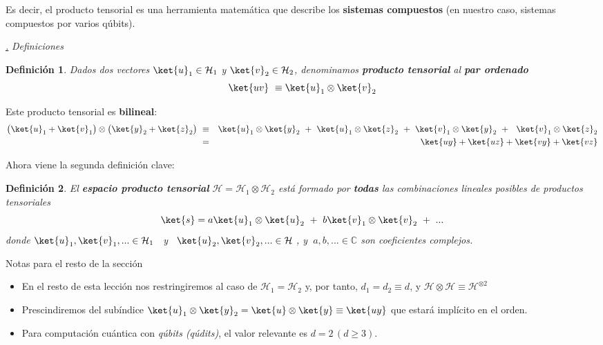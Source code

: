 \documentclass[a4paper,11pt]{book} %
\newtheorem{definicion_contador}{Definición}
\newcommand{\Definicion}[1]{
		\begin{mybox_gray2}{}
			\begin{definicion_contador}
				 #1 
			\end{definicion_contador} 
		\end{mybox_gray2}
	}
\numberwithin{equation}{chapter}
\def\subsubiContadorIt{\par\addtocounter{subsubsection}{1}\underline{\it\thesubsubsection.}\hskip0.5cm \setcounter{subsubsubsectionIt}{0}}
\newcommand{\SubsubiIt}[1]{
		\subsubiContadorIt \textit{#1}
	}
\newcounter{subsubsubsectionIt}[subsubsection]
\begin{document}
Es decir, el producto tensorial es una herramienta matemática que describe los \textbf{sistemas compuestos} (en nuestro caso, sistemas compuestos por varios qúbits).

			\SubsubiIt{Definiciones}

\Definicion{
Dados dos vectores $\ket{u}_1\in \mathcal{H}_1$ y  $\ket{v}_2\in \mathcal{H}_2$, denominamos \textbf{producto tensorial} al \textbf{par ordenado}
	\begin{equation}
	\ket{uv} ~\equiv \ket{u}_1\otimes \ket{v}_2
	\end{equation}
}
Este producto tensorial es \textbf{bilineal}:
\begin{eqnarray*}
\big(\ket{u}_1+\ket{v}_1\big)\otimes \big(\ket{y}_2+\ket{z}_2\big) ~&\equiv &
\ket{u}_1\otimes\ket{y}_2 ~+~ \ket{u}_1\otimes\ket{z}_2 ~+~ \ket{v}_1\otimes\ket{y}_2 ~+~~
 \ket{v}_1\otimes\ket{z}_2 \\
 &=& \ket{uy} + \ket{uz} + \ket{vy} + \ket{vz}
\end{eqnarray*}

Ahora viene la segunda definición clave:
	\Definicion{
	El \textbf{espacio producto tensorial}  $\mathcal{H} = \mathcal{H}_1 \otimes \mathcal{H}_2$ está formado por  \textbf{todas} las combinaciones lineales posibles de  productos tensoriales 
	\begin{equation}
	\ket{s}= a\ket{u}_1\otimes\ket{u}_2 ~+~ b \ket{v}_1\otimes\ket{v}_2 ~+ ~...
	\end{equation}
   donde  $\ket{u}_1,\ket{v}_1,...\in \mathcal{H}_1\, ~$ y $~\, \ket{u}_2,\ket{v}_2,...\in \mathcal{H}~$,
    y $~a,b,... \in {\mathbb C}$ son coeficientes complejos.
	}

	\begin{mybox_blue}{Notas para el resto de la sección}
	\begin{itemize}
		\item En el resto de esta lección nos restringiremos al caso de $\mathcal{H}_1 = \mathcal{H}_2$ y, por tanto, $d_1 = d_2 \equiv d$, y  $\mathcal{H}\otimes \mathcal{H} \equiv \mathcal{H}^{\otimes 2}$ 
    	\item Prescindiremos del subíndice $\ket{u}_1\otimes \ket{y}_2=\ket{u}\otimes \ket{y} \equiv \ket{uy}$ que estará implícito en el orden. 
   		\item Para computación cuántica con \textit{qúbits (qúdits)}, el valor relevante es $d=2\,(d\geq 3)$. 
	\end{itemize}
	\end{mybox_blue}
\end{document}

